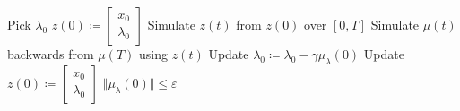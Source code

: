 \documentclass[letterpaper,11pt,titlepage]{article}
\begin{document}
\begin{enumerate}[leftmargin=0pt]
  \begin{algorithm}
    \begin{algorithmic}
      \State Pick $\lambda_0$
      \State $z(0) \coloneqq \begin{bmatrix}
        x_0 \\ \lambda_0
      \end{bmatrix}$
      \Repeat
      \State Simulate $z(t)$ from $z(0)$ over $[0,T]$
      \State Simulate $\mu(t)$ backwards from $\mu(T)$ using $z(t)$
      \State Update $\lambda_0 \coloneqq \lambda_0 - \gamma \mu_\lambda(0)$
      \State Update $z(0) \coloneqq \begin{bmatrix}
        x_0 \\ \lambda_0
      \end{bmatrix}$
      \Until $\Vert \mu_\lambda(0) \Vert \le \varepsilon$
    \end{algorithmic}           
  \end{algorithm}


\end{enumerate}
\end{document}
